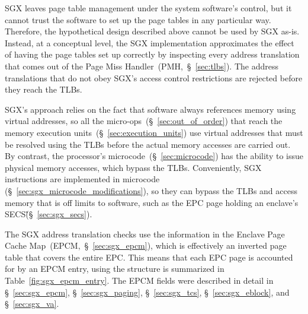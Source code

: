 SGX leaves page table management under the system software's control, but it
cannot trust the software to set up the page tables in any particular way.
Therefore, the hypothetical design described above cannot be used by SGX as-is.
Instead, at a conceptual level, the SGX implementation approximates the effect
of having the page tables set up correctly by inspecting every address
translation that comes out of the Page Miss Handler~(PMH,~\S~\ref{sec:tlbs}).
The address translations that do not obey SGX's access control restrictions
are rejected before they reach the TLBs.

SGX's approach relies on the fact that software always references memory using
virtual addresses, so all the micro-ops~(\S~\ref{sec:out_of_order}) that reach
the memory execution units~(\S~\ref{sec:execution_units}) use virtual addresses
that must be resolved using the TLBs before the actual memory accesses are
carried out. By contrast, the processor's microcode~(\S~\ref{sec:microcode})
has the ability to issue physical memory accesses, which bypass the TLBs.
Conveniently, SGX instructions are implemented in microcode
(\S~\ref{sec:sgx_microcode_modifications}), so they can bypass the TLBs and
access memory that is off limits to software, such as the EPC page holding an
enclave's SECS\~(\S~\ref{sec:sgx_secs}).


The SGX address translation checks use the information in the Enclave Page
Cache Map~(EPCM,~\S~\ref{sec:sgx_epcm}), which is effectively an inverted page
table that covers the entire EPC. This means that each EPC page is accounted
for by an EPCM entry, using the structure is summarized in
Table~\ref{fig:sgx_epcm_entry}. The EPCM fields were described in detail in
\S~\ref{sec:sgx_epcm}, \S~\ref{sec:sgx_paging}, \S~\ref{sec:sgx_tcs},
\S~\ref{sec:sgx_eblock}, and \S~\ref{sec:sgx_va}.


